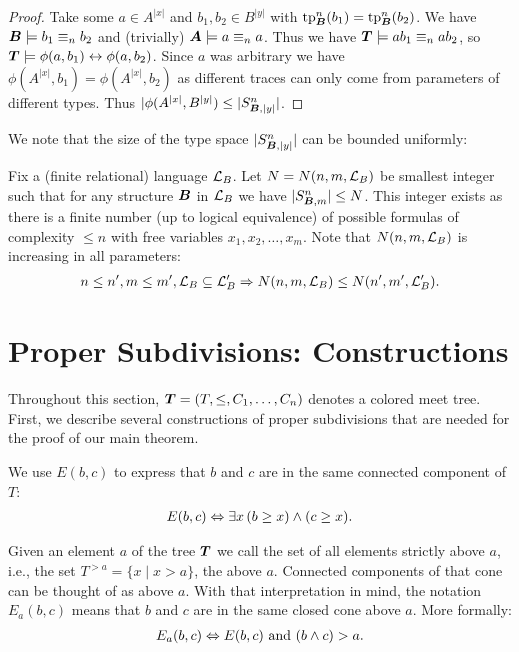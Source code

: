 \begin{proof}
  Take some $a \in A^{|x|}$ and $b_1, b_2 \in B^{|y|}$ with $\operatorname{tp}^n_{\operatorname{\boldsymbol B}}(b_1) = \operatorname{tp}^n_{\operatorname{\boldsymbol B}}(b_2)$. We have $\operatorname{\boldsymbol B} \models b_1 \equiv_n b_2$ and (trivially) $\operatorname{\boldsymbol A} \models a \equiv_n a$. Thus  we have $\operatorname{\boldsymbol T} \models ab_1 \equiv_n ab_2$, so $\operatorname{\boldsymbol T} \models \phi(a, b_1) \leftrightarrow \phi(a, b_2)$. Since $a$ was arbitrary we have $\phi(A^{|x|}, b_1) = \phi(A^{|x|}, b_2)$ as different traces can only come from parameters of different types. Thus $|\phi(A^{|x|}, B^{|y|}) \leq |S^n_{\operatorname{\boldsymbol B}, |y|}|$.
\end{proof}

We note that the size of the type space $|S^n_{\operatorname{\boldsymbol B}, |y|}|$ can be bounded uniformly:

\begin{Definition} \label{def_type_count}
  Fix a (finite relational) language $\mathcal L_B$. Let $N = N(n, m, \mathcal L_B)$ be smallest integer such that for any structure $\operatorname{\boldsymbol B}$ in $\mathcal L_B$ we have $|S^n_{\operatorname{\boldsymbol B}, m}| \leq N$. This integer exists as there is a finite number (up to logical equivalence) of possible formulas of complexity $\leq n$ with free variables $x_1,x_2, \ldots, x_m$.
  Note that $N(n, m, \mathcal L_B)$ is increasing in all parameters:
  \begin{align*}
    n \leq n', m \leq m', \mathcal L_B \subseteq \mathcal L_B' \Rightarrow N(n, m, \mathcal L_B) \leq N(n', m', \mathcal L_B').
  \end{align*}
\end{Definition}

\section{Proper Subdivisions: Constructions}
Throughout this section, $\operatorname{\boldsymbol T} = (T, \leq, C_1, \ldots, C_n)$ denotes a colored meet tree.
First, we describe several constructions of proper subdivisions that are needed for the proof of our main theorem. 
\begin{Definition}
  We use $E(b,c)$ to express that $b$ and $c$ are in the same connected component of $T$:
  \begin{align*}
    E(b, c) \Leftrightarrow \exists x \, (b \geq x) \wedge (c \geq x).
  \end{align*}
\end{Definition}
\begin{Definition}
  Given an element $a$ of the tree $\operatorname{\boldsymbol T}$ we call the set of all elements strictly above $a$, i.e., the set $T^{> a} = \{x \mid x > a\}$,
  the  above $a$.
  Connected components of that cone can be thought of as  above $a$.
  With that interpretation in mind, the notation $E_a(b, c)$ means that $b$ and $c$ are in the same closed cone above $a$. More formally:
  \begin{align*}
    E_a(b, c) \Leftrightarrow E(b,c) \text{ and } (b \wedge c) > a.
  \end{align*}
\end{Definition}

